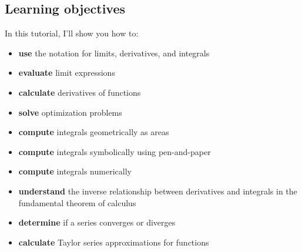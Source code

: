 
\subsection*{Learning objectives}
\noindent
In this tutorial,
I'll show you how to:

\begin{itemize}
	\item \textbf{use} the notation for limits, derivatives, and integrals
	\item \textbf{evaluate} limit expressions
	\item \textbf{calculate} derivatives of functions
	\item \textbf{solve} optimization problems
	\item \textbf{compute} integrals geometrically as areas
	\item \textbf{compute} integrals symbolically using pen-and-paper %
	\item \textbf{compute} integrals numerically %
	\item \textbf{understand} the inverse relationship between derivatives and integrals
		in the fundamental theorem of calculus
	\item \textbf{determine} if a series converges or diverges
	\item \textbf{calculate} Taylor series approximations for functions
\end{itemize}

